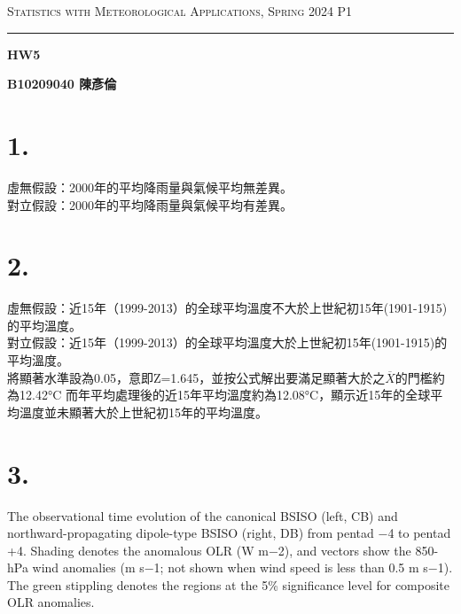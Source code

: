 \documentclass{article}
\author{B10209040 陳彥倫}
\begin{document}
\thispagestyle{empty}
\hfill {\scshape \large Statistics with Meteorological Applications, Spring 2024} \hfill {\scshape P1}
\smallskip
\hrule
\begin{CJK*}{UTF8}{bsmi}
\bigskip
\bigskip
\bigskip

\centerline{\huge \textbf {HW5}}
\bigskip
\centerline{\textbf {B10209040 陳彥倫}}


\section*{1.}
    \begin{spacing}{2.5}
        \begin{large}
            虛無假設：2000年的平均降雨量與氣候平均無差異。\\
            對立假設：2000年的平均降雨量與氣候平均有差異。
        \end{large}
    \end{spacing}

\section*{2.}
    \begin{spacing}{2.5}
        \begin{large}
            虛無假設：近15年（1999-2013）的全球平均溫度不大於上世紀初15年(1901-1915)的平均溫度。\\
            對立假設：近15年（1999-2013）的全球平均溫度大於上世紀初15年(1901-1915)的平均溫度。\\
            將顯著水準設為0.05，意即Z=1.645，並按公式解出要滿足顯著大於之$\overline{X}$的門檻約為12.42°C
            而年平均處理後的近15年平均溫度約為12.08°C，顯示近15年的全球平均溫度並未顯著大於上世紀初15年的平均溫度。
        \end{large}
    \end{spacing}

\section*{3.}
    \begin{spacing}{2.5}
        \begin{large}
            The observational time evolution of the canonical BSISO (left, CB) and northward-propagating 
            dipole-type BSISO (right, DB) from pentad −4 to pentad +4. Shading denotes the anomalous OLR 
            (W m−2), and vectors show the 850-hPa wind anomalies (m s−1; not shown when wind speed is less 
            than 0.5 m s−1). The green stippling denotes the regions at the 5\% significance level for composite 
            OLR anomalies.
        \end{large}
    \end{spacing}
        

\end{CJK*}
\end{document}
